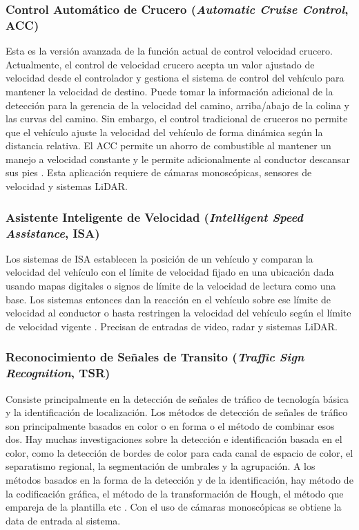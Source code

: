 \subsubsection{Control Automático de Crucero {\footnotesize(\textit{Automatic Cruise Control}, ACC)}}

Esta es la versión avanzada de la función actual de control velocidad crucero. Actualmente, el control de velocidad crucero acepta un valor ajustado de velocidad desde el controlador y gestiona el sistema de control del vehículo para mantener la velocidad de destino. Puede tomar la información adicional de la detección para la gerencia de la velocidad del camino, arriba/abajo de la colina y las curvas del camino. Sin embargo, el control tradicional de cruceros no permite que el vehículo ajuste la velocidad del vehículo de forma dinámica según la distancia relativa. El ACC permite un ahorro de combustible al mantener un manejo a velocidad constante y le permite adicionalmente al conductor descansar sus pies \cite{Thakur2016}. Esta aplicación requiere de cámaras monoscópicas, sensores de velocidad y sistemas LiDAR.


\subsubsection{Asistente Inteligente de Velocidad {\footnotesize(\textit{Intelligent Speed Assistance}, ISA)}}

Los sistemas de ISA establecen la posición de un vehículo y comparan la velocidad del vehículo con el límite de velocidad fijado en una ubicación dada usando mapas digitales o signos de límite de la velocidad de lectura como una base. Los sistemas entonces dan la reacción en el vehículo sobre ese límite de velocidad al conductor o hasta restringen la velocidad del vehículo según el límite de velocidad vigente \cite{Swov2008}. Precisan de entradas de video, radar y sistemas LiDAR.

\subsubsection{Reconocimiento de Señales de Transito {\footnotesize(\textit{Traffic Sign Recognition}, TSR)}}

Consiste principalmente en la detección de señales de tráfico de tecnología básica y la identificación de localización. Los métodos de detección de señales de tráfico son principalmente basados en color o en forma o el método de combinar esos dos. Hay muchas investigaciones sobre la detección e identificación basada en el color, como la detección de bordes de color para cada canal de espacio de color, el separatismo regional, la segmentación de umbrales y la agrupación. A los métodos basados en la forma de la detección y de la identificación, hay método de la codificación gráfica, el método de la transformación de Hough, el método que empareja de la plantilla etc \cite{Wang2010}. Con el uso de cámaras monoscópicas se obtiene la data de entrada al sistema.

